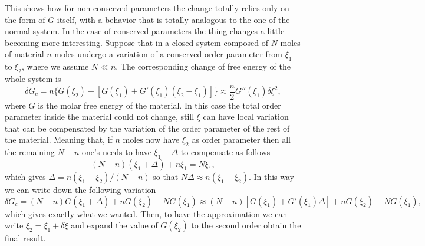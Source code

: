 \noindent
This shows how for non-conserved parameters the change totally relies only on the form of $G$ itself, with a behavior that is totally analogous to the one of the normal system. In the case of conserved parameters the thing changes a little becoming more interesting.
{
    Suppose that in a closed system composed of $N$ moles of material $n$ moles undergo a variation of a conserved order parameter from $\xi_1$ to $\xi_2$, where we assume $N\ll n$. The corresponding change of free energy of the whole system is
    \begin{equation}
        \label{eq:ConservedChange}
        \delta G_c = n\{G(\xi_2) - [G(\xi_1) + G'(\xi_1)(\xi_2 - \xi_1)]\} \approx \frac{n}{2} G''(\xi_1)\delta\xi^2,
    \end{equation}
    where $G$ is the molar free energy of the material.
}
{
    In this case the total order parameter inside the material could not change, still $\xi$ can have local variation that can be compensated by the variation of the order parameter of the rest of the material. Meaning that, if $n$ moles now have $\xi_2$ as order parameter then all the remaining $N-n$ one's needs to have $\xi_1 - \Delta$ to compensate as follows 
    \begin{equation}
        (N-n)(\xi_1 + \Delta) +n\xi_1 = N\xi_1,
    \end{equation}
    which gives $\Delta = n(\xi_1 - \xi_2)/(N-n)$ so that $N\Delta \approx n(\xi_1 - \xi_2)$. In this way we can write down the following variation
    \begin{equation}
        \delta G_c = (N-n)G(\xi_1 + \Delta) + nG(\xi_2) - NG(\xi_1) \approx (N-n)[G(\xi_1) + G'(\xi_1)\Delta] + nG(\xi_2) - NG(\xi_1),
    \end{equation}
    which gives exactly what we wanted. Then, to have the approximation we can write $\xi_2 = \xi_1 + \delta\xi$ and expand the value of $G(\xi_2)$ to the second order obtain the final result.
}
\noindent
